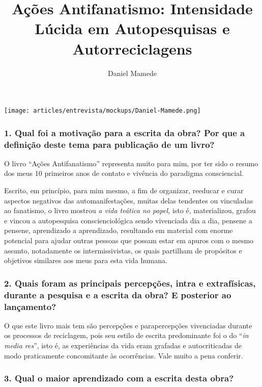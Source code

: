 \documentclass{gescons}
\author{Daniel Mamede}
\title{Ações Antifanatismo: Intensidade Lúcida em Autopesquisas e Autorreciclagens}
\begin{document}
    \makeentrevistatitle

    \begin{multicols}{2}

\begin{center}
    \texttt{[image: articles/entrevista/mockups/Daniel-Mamede.png]}
\end{center}


\subsubsection{1. Qual foi a motivação para a escrita da obra? Por que a definição deste tema para publicação de um livro?}

O livro “Ações Antifanatismo” representa muito para mim, por ter sido o resumo dos meus 10 primeiros anos de contato e vivência do paradigma consciencial. 

Escrito, em princípio, para mim mesmo, a fim de organizar, reeducar e curar aspectos negativos das automanifestações, muitas delas tendentes ou vinculadas ao fanatismo, o livro mostrou \textit{a vida teática no papel,} isto é, materializou, grafou e vincou a autopesquisa conscienciológica sendo vivenciada dia a dia, pensene a pensene, aprendizado a aprendizado, resultando em material com enorme potencial para ajudar outras pessoas que possam estar em apuros com o mesmo assunto, notadamente os intermissivistas, os quais partilham de propósitos e objetivos similares aos meus para esta vida humana.



\subsubsection{2. Quais foram as principais percepções, intra e extrafísicas, durante a pesquisa e a escrita da obra? E posterior ao lançamento?}

O que este livro mais tem são percepções e parapercepções vivenciadas durante os processos de reciclagem, pois seu estilo de escrita predominante foi o do “\textit{in media res}”, isto é, as experiências da vida eram grafadas e autocriticadas de modo praticamente concomitante às ocorrências. Vale muito a pena conferir. 


\subsubsection{3.       Qual o maior aprendizado com a escrita desta obra?}


\end{multicols}
\end{document}
